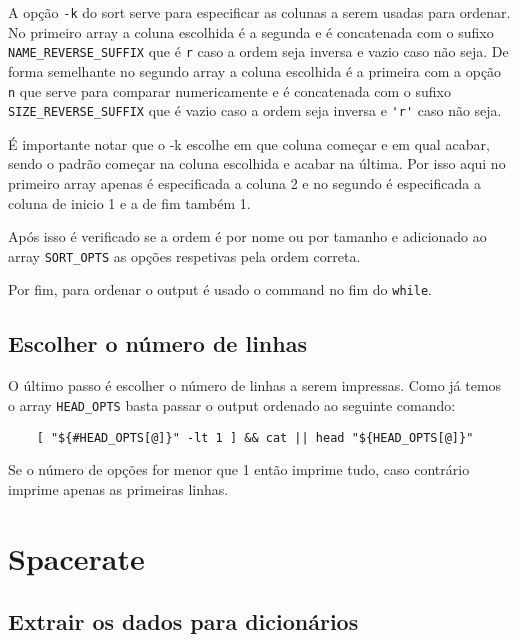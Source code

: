A opção \Verb|-k| do sort serve para especificar as colunas a serem usadas para ordenar.
No primeiro array a coluna escolhida é a segunda e é concatenada com o sufixo \Verb|NAME_REVERSE_SUFFIX| que é \Verb|r| caso a ordem seja inversa e vazio caso não seja.
De forma semelhante no segundo array a coluna escolhida é a primeira com a opção \Verb|n| que serve para comparar numericamente e é concatenada com o sufixo \Verb|SIZE_REVERSE_SUFFIX| que é vazio caso a ordem seja inversa e \Verb|'r'| caso não seja.

É importante notar que o -k escolhe em que coluna começar e em qual acabar, sendo o padrão começar na coluna escolhida e acabar na última.
Por isso aqui no primeiro array apenas é especificada a coluna 2 e no segundo é especificada a coluna de inicio 1 e a de fim também 1.

Após isso é verificado se a ordem é por nome ou por tamanho e adicionado ao array \Verb|SORT_OPTS| as opções respetivas pela ordem correta.

Por fim, para ordenar o output é usado o command  no fim do \Verb|while|.

\subsection{Escolher o número de linhas}\label{sec:implementation_head}

O último passo é escolher o número de linhas a serem impressas.
Como já temos o array \Verb|HEAD_OPTS| basta passar o output ordenado ao seguinte comando:

\begin{listing}[H]
	\centering
	\begin{verbatim}
    [ "${#HEAD_OPTS[@]}" -lt 1 ] && cat || head "${HEAD_OPTS[@]}"
  \end{verbatim}
\end{listing}

Se o número de opções for menor que 1 então imprime tudo, caso contrário imprime apenas as primeiras linhas.

\section{Spacerate}

\subsection{Extrair os dados para dicionários}

